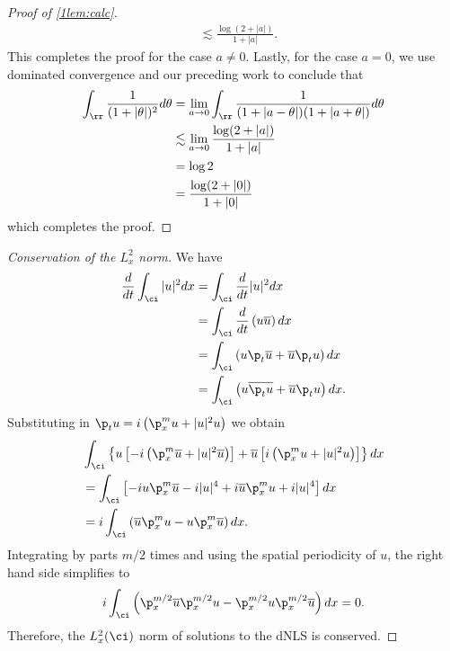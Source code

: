 \begin{proof}[Proof of \cref{1lem:calc}]
\begin{equation*}
\begin{split}
		& \lesssim \frac{\log(2 + | a |)}{1 + | a |}.
	\end{split}
\end{equation*}
%
%
This completes the proof for the case $a \neq 0$. Lastly, for the case
$a =0$, we use dominated convergence and our preceding work to
conclude that
%
%
\begin{equation*}
	\begin{split}
		\int_{\rr} \frac{1}{(1 + | \theta|)^2} d \theta
		& = \lim_{a \to 0}
		\int_{\rr} \frac{1}{(1 + | a - \theta |)(1 + | a + \theta |)}d \theta
		\\
		& \lesssim \lim_{a \to 0} \frac{\log(2 + | a |)}{1 + | a |}
		\\
		& =  \log 2
		\\
		& = \frac{\log(2 + | 0 |)}{1 + | 0 |} 
	\end{split}
\end{equation*}
%
which completes the proof.
%
\end{proof}
%
\begin{proof}[Conservation of the $L_x^2$ norm] 
We have
%
%
\begin{equation*}
	\begin{split}
		\frac{d}{dt} \int_\ci | u |^2  dx
		& = \int_\ci \frac{d}{dt} | u |^2  dx
		\\
		& = \int_\ci \frac{d}{dt} \left( u \overline{u} \right)  dx
		\\
		& = \int_\ci \left( u \p_t \overline{u} + \overline{u} \p_t u \right) dx
		\\
		& = \int_\ci \left( u \overline{\p_t u} + \overline{u} \p_t u \right)dx.
	\end{split}
\end{equation*}
%
%
Substituting in $\p_t u = i\left( \p_x^{m} u + | u |^2 u \right)$ we obtain
%
%
\begin{equation*}
	\begin{split}
		& \int_{\ci} \left\{ u\left[ -i\left( \p_x^{m} \overline{u} + | u |^2
		\overline{u} \right) \right] + \overline{u}\left[ i\left( \p_x^{m} u + | u
		|^2 u \right) \right] \right\}dx
		\\
		& = \int_\ci \left[ -iu \p_x^{m} \overline{u} - i| u |^4 + i \overline{u}
		\p_x^{m} u + i | u |^4 \right]dx
		\\
		& = i \int_{\ci}\left( \overline{u} \p_x^{m} u - u \p_x^{m } \overline{u}
		\right)dx.
	\end{split}
\end{equation*}
%
%
Integrating by parts $m/2$ times and using
the spatial periodicity of $u$, the right
hand side simplifies to
%
%
\begin{equation*}
	\begin{split}
		i \int_\ci \left( \p_x^{m/2} \overline{u} \p_x^{m/2} u - \p_x^{m/2} u
		\p_x^{m/2 } 
		\overline{u} \right) dx = 0.
	\end{split}
\end{equation*}
%
%
Therefore, the $L_x^2(\ci)$ norm of solutions to the dNLS is conserved. 
\end{proof}

